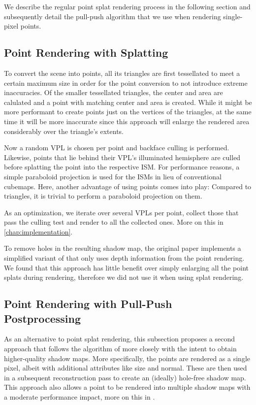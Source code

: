 We describe the regular point splat rendering process in the following section and subsequently detail the pull-push algorithm that we use when rendering single-pixel points.


\subsection{Point Rendering with Splatting}

To convert the scene into points, all its triangles are first tessellated to meet a certain maximum size in order for the point conversion to not introduce extreme inaccuracies. Of the smaller tessellated triangles, the center and area are calulated and a point with matching center and area is created. While it might be more performant to create points just on the vertices of the triangles, at the same time it will be more inaccurate since this approach will enlarge the rendered area considerably over the triangle's extents.

Now a random VPL is chosen per point and backface culling is performed. Likewise, points that lie behind their VPL's illuminated hemisphere are culled before splatting the point into the respective ISM. For performance reasons, a simple paraboloid projection is used for the ISMs in lieu of conventional cubemaps. Here, another advantage of using points comes into play: Compared to triangles, it is trivial to perform a paraboloid projection on them.

As an optimization, we iterate over several VPLs per point, collect those that pass the culling test and render to all the collected ones. More on this in \cref{chap:implementation}.

To remove holes in the resulting shadow map, the original paper implements a simplified variant of \citet{Marroquim:2007:reconstruction} that only uses depth information from the point rendering. We found that this approach has little benefit over simply enlarging all the point splats during rendering, therefore we did not use it when using splat rendering.



\subsection{Point Rendering with Pull-Push Postprocessing}

As an alternative to point splat rendering, this subsection proposes a second approach that follows the algorithm of \citet{Marroquim:2007:reconstruction} more closely with the intent to obtain higher-quality shadow maps. More specifically, the points are rendered as a single pixel, albeit with additional attributes like size and normal. These are then used in a subsequent reconstruction pass to create an (ideally) hole-free shadow map. This approach also allows a point to be rendered into multiple shadow maps with a moderate performance impact, more on this in .

